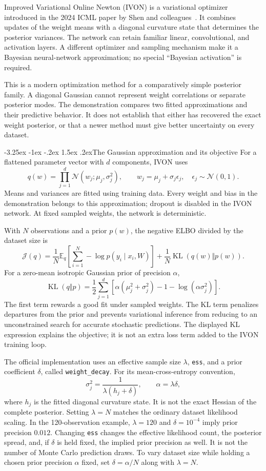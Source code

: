 \documentclass[11pt,a4paper]{article}
\makeatletter
\newcommand{\E}{\mathbb E}
\newcommand{\KL}{\operatorname{KL}}
\newcommand{\Normal}{\mathcal N}
\renewcommand\subsection{\@startsection{subsection}{2}{\z@}%
  {-3.25ex \@plus -1ex \@minus -.2ex}%
  {1.5ex \@plus .2ex}{\normalfont\large}}
\makeatother
\begin{document}
Improved Variational Online Newton (IVON) is a variational optimizer introduced
in the 2024 ICML paper by Shen and colleagues~\cite{ivon2024}. It combines
updates of the weight means with a diagonal curvature state that determines
the posterior variances. The network can retain familiar linear,
convolutional, and activation layers. A different optimizer and sampling
mechanism make it a Bayesian neural-network approximation; no special
``Bayesian activation'' is required.

This is a modern optimization method for a comparatively simple posterior
family. A diagonal Gaussian cannot represent weight correlations or separate
posterior modes. The demonstration compares two fitted approximations and
their predictive behavior. It does not establish that either has recovered
the exact weight posterior, or that a newer method must give better
uncertainty on every dataset.

\subsection{The Gaussian approximation and its objective}
For a flattened parameter vector with $d$ components, IVON uses
\[
 q(w)=\prod_{j=1}^{d}\Normal(w_j;\mu_j,\sigma_j^2),
 \qquad w_j=\mu_j+\sigma_j\epsilon_j,
 \quad \epsilon_j\sim\Normal(0,1).
\]
Means and variances are fitted using training data. Every weight and bias in
the demonstration belongs to this approximation; dropout is disabled in the
IVON network. At fixed sampled weights, the network is deterministic.

With $N$ observations and a prior $p(w)$, the negative ELBO divided by the
dataset size is
\[
 \mathcal J(q)=\frac1N\E_q\!\left[
    \sum_{i=1}^{N}-\log p(y_i\mid x_i,W)\right]
       +\frac1N\KL(q(w)\Vert p(w)).
\]
For a zero-mean isotropic Gaussian prior of precision $\alpha$,
\[
 \KL(q\Vert p)=\frac12\sum_{j=1}^{d}
 \left[\alpha(\mu_j^2+\sigma_j^2)-1
              -\log(\alpha\sigma_j^2)\right].
\]
The first term rewards a good fit under sampled weights. The KL term penalizes
departures from the prior and prevents variational inference from reducing to
an unconstrained search for accurate stochastic predictions. The displayed
KL expression explains the objective; it is not an extra loss term added to
the IVON training loop.

The official implementation uses an effective sample size $\lambda$,
\texttt{ess}, and a prior coefficient $\delta$, called
\texttt{weight\_decay}. For its mean-cross-entropy convention,
\[
 \sigma_j^2=\frac{1}{\lambda(h_j+\delta)},
 \qquad \alpha=\lambda\delta,
\]
where $h_j$ is the fitted diagonal curvature state. It is not the exact
Hessian of the complete posterior. Setting $\lambda=N$ matches the ordinary
dataset likelihood scaling. In the 120-observation example,
$\lambda=120$ and $\delta=10^{-4}$ imply prior precision $0.012$.
Changing \texttt{ess} changes the effective likelihood count, the posterior
spread, and, if $\delta$ is held fixed, the implied prior precision as well.
It is not the number of Monte Carlo prediction draws. To vary dataset size
while holding a chosen prior precision $\alpha$ fixed, set
$\delta=\alpha/N$ along with $\lambda=N$.
\end{document}
